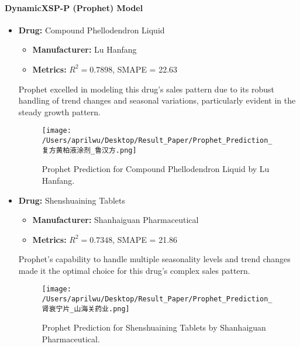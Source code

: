 \documentclass[journal]{IEEEtran}
\begin{document}
\paragraph{DynamicXSP-P (Prophet) Model}
\begin{itemize}
\item \textbf{Drug:} Compound Phellodendron Liquid
\begin{itemize}
\item \textbf{Manufacturer:} Lu Hanfang
\item \textbf{Metrics:} $R^2 = 0.7898$, SMAPE = 22.63
\end{itemize}
Prophet excelled in modeling this drug's sales pattern due to its robust handling of trend changes and seasonal variations, particularly evident in the steady growth pattern.
\begin{figure}[H]
\centering
\texttt{[image: /Users/aprilwu/Desktop/Result\_Paper/Prophet\_Prediction\_复方黄柏液涂剂\_鲁汉方.png]}
\caption{Prophet Prediction for Compound Phellodendron Liquid by Lu Hanfang.}
\label{fig:phellodendron}
\end{figure}
\item \textbf{Drug:} Shenshuaining Tablets
\begin{itemize}
\item \textbf{Manufacturer:} Shanhaiguan Pharmaceutical
\item \textbf{Metrics:} $R^2 = 0.7348$, SMAPE = 21.86
\end{itemize}
Prophet's capability to handle multiple seasonality levels and trend changes made it the optimal choice for this drug's complex sales pattern.
\begin{figure}[H]
\centering
\texttt{[image: /Users/aprilwu/Desktop/Result\_Paper/Prophet\_Prediction\_肾衰宁片\_山海关药业.png]}
\caption{Prophet Prediction for Shenshuaining Tablets by Shanhaiguan Pharmaceutical.}
\label{fig:shenshuaining}
\end{figure}
\end{itemize}
\end{document}
